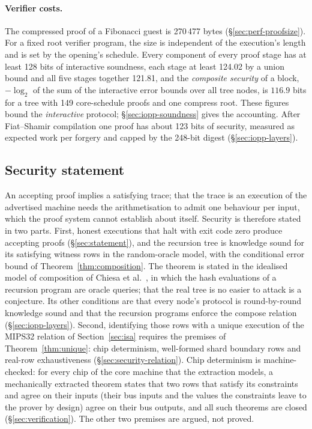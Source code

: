 \paragraph{Verifier costs.} The compressed proof of a Fibonacci guest is 270\,477 bytes (\S\ref{sec:perf-proofsize}). For a fixed root verifier program, the size is independent of the execution's length and is set by the opening's schedule. Every component of every proof stage has at least 128 bits of interactive soundness, each stage at least 124.02 by a union bound and all five stages together 121.81, and the \emph{composite security} of a block, $-\log_2$ of the sum of the interactive error bounds over all tree nodes, is $116.9$ bits for a tree with 149 core-schedule proofs and one compress root. These figures bound the \emph{interactive} protocol; \S\ref{sec:iopp-soundness} gives the accounting. After Fiat--Shamir compilation one proof has about 123 bits of security, measured as expected work per forgery and capped by the 248-bit digest (\S\ref{sec:iopp-layers}).

\subsection{Security statement}
\label{sec:intro-audit}

An accepting proof implies a satisfying trace; that the trace is an execution of the advertised machine needs the arithmetisation to admit one behaviour per input, which the proof system cannot establish about itself. Security is therefore stated in two parts. First, honest executions that halt with exit code zero produce accepting proofs (\S\ref{sec:statement}), and the recursion tree is knowledge sound for its satisfying witness rows in the random-oracle model, with the conditional error bound of Theorem~\ref{thm:composition}. The theorem is stated in the idealised model of composition of Chiesa et al.~\citep{cgsy24}, in which the hash evaluations of a recursion program are oracle queries; that the real tree is no easier to attack is a conjecture. Its other conditions are that every node's protocol is round-by-round knowledge sound and that the recursion programs enforce the compose relation (\S\ref{sec:iopp-layers}). Second, identifying those rows with a unique execution of the MIPS32 relation of Section~\ref{sec:isa} requires the premises of Theorem~\ref{thm:unique}: chip determinism, well-formed shard boundary rows and real-row exhaustiveness (\S\ref{sec:security-relation}). Chip determinism is machine-checked: for every chip of the core machine that the extraction models, a mechanically extracted \Lean{} theorem states that two rows that satisfy its constraints and agree on their inputs (their bus inputs and the values the constraints leave to the prover by design) agree on their bus outputs, and all \ndettotal{} such theorems are closed (\S\ref{sec:verification}). The other two premises are argued, not proved.

